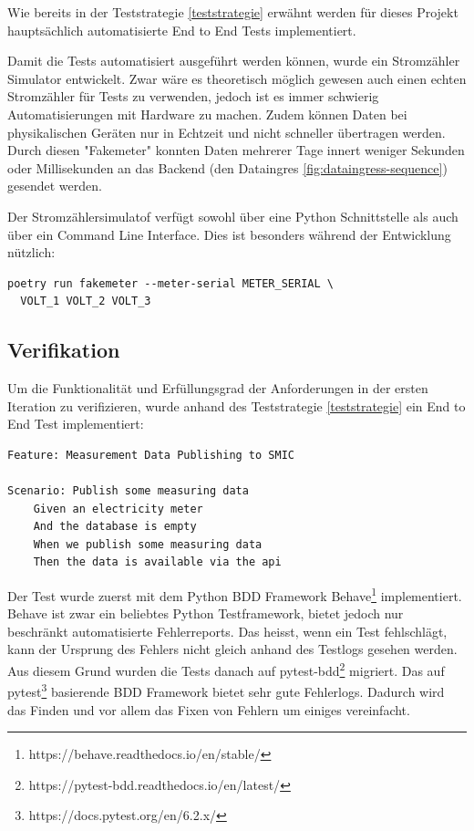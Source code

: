Wie bereits in der Teststrategie \ref{teststrategie} erwähnt werden für dieses Projekt
hauptsächlich automatisierte End to End Tests implementiert.

Damit die Tests automatisiert ausgeführt werden können, wurde ein Stromzähler Simulator entwickelt.
Zwar wäre es theoretisch möglich gewesen auch einen echten Stromzähler für Tests zu verwenden,
jedoch ist es immer schwierig Automatisierungen mit Hardware zu machen. Zudem können
Daten bei physikalischen Geräten nur in Echtzeit und nicht schneller übertragen werden.
Durch diesen "Fakemeter" konnten Daten mehrerer Tage innert weniger Sekunden oder Millisekunden
an das Backend (den Dataingres \ref{fig:dataingress-sequence}) gesendet werden.

Der Stromzählersimulatof verfügt sowohl über eine Python Schnittstelle als auch über
ein Command Line Interface. Dies ist besonders während der Entwicklung nützlich:

\begin{verbatim}
poetry run fakemeter --meter-serial METER_SERIAL \
  VOLT_1 VOLT_2 VOLT_3
\end{verbatim}


\subsection{Verifikation}

Um die Funktionalität und Erfüllungsgrad der Anforderungen in der ersten Iteration zu verifizieren, wurde anhand
des Teststrategie \ref{teststrategie} ein End to End Test implementiert:


\begin{verbatim}
Feature: Measurement Data Publishing to SMIC

Scenario: Publish some measuring data
    Given an electricity meter
    And the database is empty
    When we publish some measuring data
    Then the data is available via the api
\end{verbatim}

Der Test wurde zuerst mit dem Python \ac{BDD} Framework Behave\footnote{https://behave.readthedocs.io/en/stable/}
implementiert. Behave ist zwar ein beliebtes Python Testframework, bietet jedoch nur
beschränkt automatisierte Fehlerreports. Das heisst, wenn ein Test fehlschlägt, kann der Ursprung
des Fehlers nicht gleich anhand des Testlogs gesehen werden.
Aus diesem Grund wurden die Tests danach auf pytest-bdd\footnote{https://pytest-bdd.readthedocs.io/en/latest/}
migriert. Das auf pytest\footnote{https://docs.pytest.org/en/6.2.x/} basierende \ac{BDD} Framework
bietet sehr gute Fehlerlogs. Dadurch wird das Finden und vor allem das Fixen von Fehlern
um einiges vereinfacht.

